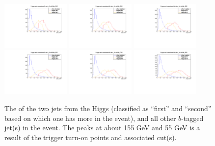 \begin{figure}[H]
    \includegraphics[width=0.3\textwidth]{SignalKin/jet_pt_compare_bAbb_500.pdf}
    \includegraphics[width=0.3\textwidth]{SignalKin/jet_pt_compare_bAbb_550.pdf}
    \includegraphics[width=0.3\textwidth]{SignalKin/jet_pt_compare_bAbb_600.pdf}
    \newline
    \includegraphics[width=0.3\textwidth]{SignalKin/jet_pt_compare_bAbb_650.pdf}
    \includegraphics[width=0.3\textwidth]{SignalKin/jet_pt_compare_bAbb_700.pdf}
    \includegraphics[width=0.3\textwidth]{SignalKin/jet_pt_compare_bAbb_800.pdf}
    \label{fig:pt_higgs_and_associated_jets}
    \caption{The \pt of the two jets from the Higgs (classified as ``first'' and ``second'' based
    on which one has more \pt in the event), and all other $b$-tagged jet(s) in the event.
    The peaks at about 155 GeV and 55 GeV is a result of the trigger turn-on points and
    associated cut(s).  }
\end{figure}


